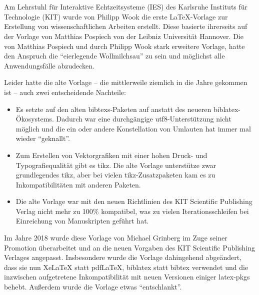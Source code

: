 \chapter*{\TransAcknowledgements}
%
%
%
\markboth{\TransAcknowledgements}{\TransAcknowledgements}
%
%
Am Lehrstuhl für Interaktive Echtzeitsysteme (IES) des Karlsruhe Instituts für Technologie (KIT) wurde von Philipp Wook die erste LaTeX-Vorlage zur Erstellung von wissenschaftlichen Arbeiten erstellt.
Diese basierte ihrerseits auf der Vorlage von Matthias Pospiech von der Leibniz Universität Hannover.
Die von Matthias Pospiech und durch Philipp Wook stark erweitere Vorlage, hatte den Anspruch die \enquote{eierlegende Wollmilchsau} zu sein und möglichst alle
Anwendungsfälle abzudecken.

Leider hatte die alte Vorlage -- die mittlerweile ziemlich in die Jahre gekommen ist -- auch zwei entscheidende Nachteile:
\begin{itemize}
  \item Es setzte auf den alten \glspl{bibtex}-Paketen auf anstatt des neueren \gls{biblatex}-Ökosystems.
				Dadurch war eine durchgängige	\gls{utf8}-Unterstützung nicht möglich und die ein oder andere Konstellation von Umlauten hat immer mal wieder \enquote{geknallt}.
		
  \item Zum Erstellen von Vektorgrafiken mit einer hohen Druck- und Typografiequalität gibt es \gls{tikz}.
				Die alte Vorlage unterstütze zwar grundlegendes \gls{tikz}, aber bei vielen \gls{tikz}-Zusatzpaketen kam es zu Inkompatibilitäten mit anderen Paketen.
				
	\item Die alte Vorlage war mit den neuen Richtlinien des KIT Scientific Publishing Verlag nicht mehr zu 100\% kompatibel, was zu vielen Iterationsschleifen bei Einreichung von Manuskripten geführt hat.
\end{itemize}

Im Jahre 2018 wurde diese Vorlage von Michael Grinberg im Zuge seiner Promotion überarbeitet und an die neuen Vorgaben des KIT Scientific Publishing Verlages angepasst.
Insbesondere wurde die Vorlage dahingehend abgeändert, dass sie nun XeLaTeX statt pdfLaTeX, \gls{biblatex} statt \gls{bibtex} verwendet und die inzwischen aufgetretene Inkompatibilität mit neuen Versionen einiger \gls{latex}-\glspl{pkg} behebt.
Außerdem wurde die Vorlage etwas \enquote{entschlankt}.

